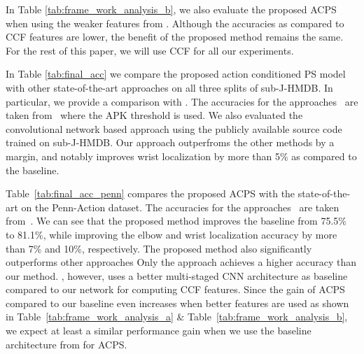 \documentclass[a4paper, 10pt, conference]{ieeeconf}      \usepackage{FG2017}
\begin{document}
In Table \ref{tab:frame_work_analysis_b}, we also evaluate the proposed ACPS when using the weaker features from \cite{dantone_tpami2014}. Although the accuracies as compared to CCF features are lower, the benefit of the proposed method remains the same. For the rest of this paper, we will use CCF for all our experiments.




	
	
	

In Table \ref{tab:final_acc} we compare the proposed action conditioned PS model with other state-of-the-art approaches on all three splits of sub-J-HMDB. In particular, we provide a comparison with \cite{dantone_tpami2014, yang_tpami2014, bruce_cvpr2015, park_iccv2011, cherian_cvpr2014, chen_nips2014}. The accuracies for the approaches~\cite{yang_tpami2014, bruce_cvpr2015, park_iccv2011, cherian_cvpr2014} are taken from~\cite{bruce_cvpr2015} where the APK threshold  is used. We also evaluated the convolutional network based approach \cite{chen_nips2014} using the publicly available source code trained on sub-J-HMDB. Our approach outperfroms the other methods by a margin, and notably improves wrist localization by more than 5\% as compared to the baseline. 

Table~\ref{tab:final_acc_penn} compares the proposed ACPS with the state-of-the-art on the Penn-Action dataset. The accuracies for the approaches~\cite{yang_tpami2014, bruce_cvpr2015, park_iccv2011} are taken from~\cite{bruce_cvpr2015}. We can see that the proposed method improves the baseline from 75.5\% to 81.1\%, while improving the elbow and wrist localization accuracy by more than 7\% and 10\%, respectively.  The proposed method also significantly outperforms other approaches Only the approach \cite{georgia2016eccv} achieves a higher accuracy than our method. \cite{georgia2016eccv}, however, uses a better multi-staged CNN architecture as baseline compared to our network for computing CCF features. Since the gain of ACPS compared to our baseline even increases when better features are used as shown in  Table~\ref{tab:frame_work_analysis_a} \& Table~\ref{tab:frame_work_analysis_b}, we expect at least a similar performance gain when we use the baseline architecture from \cite{georgia2016eccv} for ACPS.
\end{document}
